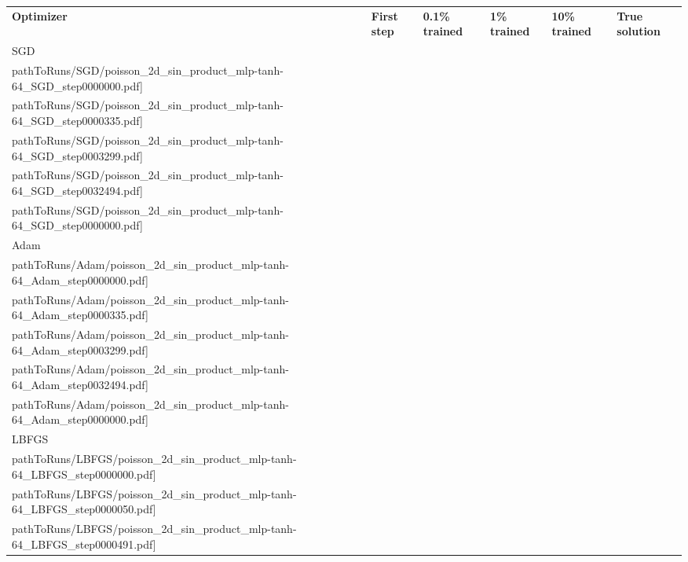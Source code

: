 \begin{table}[!h]
  \centering
  \def\pathToRuns{kfac_pinns_exp/exp42_visualize_solutions/visualize_solution}
  \renewcommand\tabularxcolumn[1]{>{\Centering}m{#1}}
  \begin{small}
    \begin{tabularx}{\textwidth}{XXXXXX}
      \textbf{Optimizer} & \textbf{First step} & \textbf{0.1\% trained} & \textbf{1\% trained} & \textbf{10\% trained} & \textbf{True solution}
      \\
      SGD
      &\texttt{[image: \\pathToRuns/SGD/poisson\_2d\_sin\_product\_mlp-tanh-64\_SGD\_step0000000.pdf]}
      &\texttt{[image: \\pathToRuns/SGD/poisson\_2d\_sin\_product\_mlp-tanh-64\_SGD\_step0000335.pdf]}
      &\texttt{[image: \\pathToRuns/SGD/poisson\_2d\_sin\_product\_mlp-tanh-64\_SGD\_step0003299.pdf]}
      &\texttt{[image: \\pathToRuns/SGD/poisson\_2d\_sin\_product\_mlp-tanh-64\_SGD\_step0032494.pdf]}
      &\texttt{[image: \\pathToRuns/SGD/poisson\_2d\_sin\_product\_mlp-tanh-64\_SGD\_step0000000.pdf]}
      \\
      Adam
      &\texttt{[image: \\pathToRuns/Adam/poisson\_2d\_sin\_product\_mlp-tanh-64\_Adam\_step0000000.pdf]}
      &\texttt{[image: \\pathToRuns/Adam/poisson\_2d\_sin\_product\_mlp-tanh-64\_Adam\_step0000335.pdf]}
      &\texttt{[image: \\pathToRuns/Adam/poisson\_2d\_sin\_product\_mlp-tanh-64\_Adam\_step0003299.pdf]}
      &\texttt{[image: \\pathToRuns/Adam/poisson\_2d\_sin\_product\_mlp-tanh-64\_Adam\_step0032494.pdf]}
      &\texttt{[image: \\pathToRuns/Adam/poisson\_2d\_sin\_product\_mlp-tanh-64\_Adam\_step0000000.pdf]}
      \\
      LBFGS
      & \texttt{[image: \\pathToRuns/LBFGS/poisson\_2d\_sin\_product\_mlp-tanh-64\_LBFGS\_step0000000.pdf]}
      & \texttt{[image: \\pathToRuns/LBFGS/poisson\_2d\_sin\_product\_mlp-tanh-64\_LBFGS\_step0000050.pdf]}
      & \texttt{[image: \\pathToRuns/LBFGS/poisson\_2d\_sin\_product\_mlp-tanh-64\_LBFGS\_step0000491.pdf]}

\end{tabularx}
\end{small}
\end{table}
